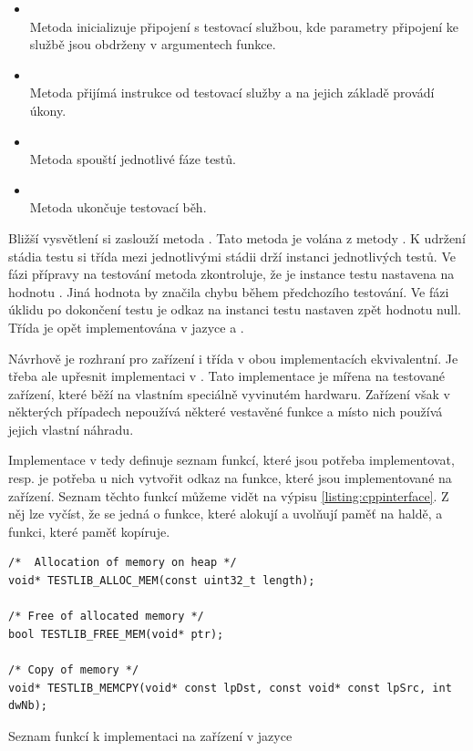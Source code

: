\begin{itemize}
    \item {} \\ Metoda inicializuje připojení s testovací službou, kde parametry připojení ke službě jsou obdrženy v argumentech funkce.
    \item {} \\ Metoda přijímá instrukce od testovací služby a na jejich základě provádí úkony.
    \item {} \\ Metoda spouští jednotlivé fáze testů. 
    \item {} \\ Metoda ukončuje testovací běh.
\end{itemize}

Bližší vysvětlení si zaslouží metoda . Tato metoda je volána z metody . K udržení stádia testu si třída mezi jednotlivými stádii drží instanci jednotlivých testů. Ve fázi přípravy na testování metoda zkontroluje, že je instance testu nastavena na hodnotu . Jiná hodnota by značila chybu během předchozího testování. Ve fázi úklidu po dokončení testu je odkaz na instanci testu nastaven zpět hodnotu null. Třída  je opět implementována v jazyce \csharp{} a \cpp{}.

Návrhově je rozhraní pro zařízení i třída  v obou implementacích ekvivalentní. Je třeba ale upřesnit implementaci v \cpp{}. Tato implementace je mířena na testované zařízení, které běží na vlastním speciálně vyvinutém hardwaru. Zařízení však v některých případech nepoužívá některé vestavěné funkce a místo nich používá jejich vlastní náhradu. 

Implementace v \cpp{} tedy definuje seznam funkcí, které jsou potřeba implementovat, resp. je potřeba u nich vytvořit odkaz na funkce, které jsou implementované na zařízení. Seznam těchto funkcí můžeme vidět na výpisu \ref{listing:cppinterface}. Z něj lze vyčíst, že se jedná o funkce, které alokují a uvolňují paměť na haldě, a funkci, které paměť kopíruje. 

\begin{listing}[H]
    \centering
    \begin{verbatim}
/*  Allocation of memory on heap */
void* TESTLIB_ALLOC_MEM(const uint32_t length);

/* Free of allocated memory */
bool TESTLIB_FREE_MEM(void* ptr);

/* Copy of memory */
void* TESTLIB_MEMCPY(void* const lpDst, const void* const lpSrc, int dwNb);
    \end{verbatim}
    \caption{Seznam funkcí k implementaci na zařízení v jazyce \protect\cpp{}}
    \label{listing:cppinterface}
\end{listing}


